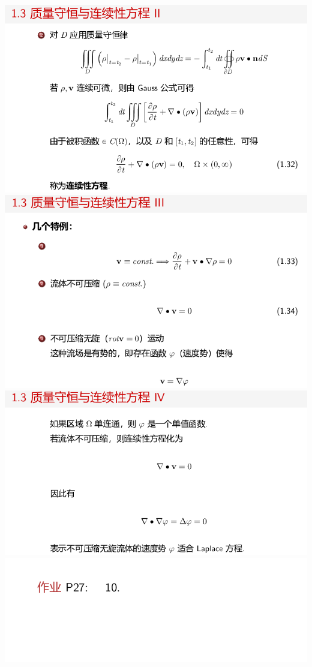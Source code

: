 \documentclass[11pt,a4paper]{ctexart}
\begin{document}
\begin{paracol}{2}
\newpage
\includegraphics[width=\linewidth]{chap01_42.png}
\includegraphics[width=\linewidth]{chap01_43.png}
\includegraphics[width=\linewidth]{chap01_44.png}
\newpage
\includegraphics[width=\linewidth]{chap01_45.png}

\end{paracol}
\end{document}
